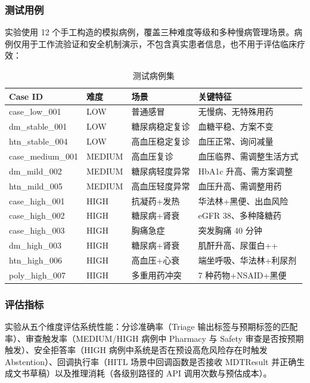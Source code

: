 \documentclass[11pt,a4paper]{ctexart}
\begin{document}
\subsubsection{测试用例}

实验使用 12 个手工构造的模拟病例，覆盖三种难度等级和多种慢病管理场景。病例仅用于工作流验证和安全机制演示，不包含真实患者信息，也不用于评估临床疗效：

\begin{table}[H]
\centering
\caption{测试病例集}
\label{tab:cases}
\small
\begin{tabularx}{\textwidth}{l|l|l|X}
\toprule
\textbf{Case ID} & \textbf{难度} & \textbf{场景} & \textbf{关键特征} \\
\midrule
case\_low\_001 & LOW & 普通感冒 & 无慢病、无特殊用药 \\
dm\_stable\_001 & LOW & 糖尿病稳定复诊 & 血糖平稳、方案不变 \\
htn\_stable\_004 & LOW & 高血压稳定复诊 & 血压正常、询问减量 \\
\hline
case\_medium\_001 & MEDIUM & 高血压复诊 & 血压临界、需调整生活方式 \\
dm\_mild\_002 & MEDIUM & 糖尿病轻度异常 & HbA1c 升高、需方案调整 \\
htn\_mild\_005 & MEDIUM & 高血压轻度异常 & 血压升高、需调整用药 \\
\hline
case\_high\_001 & HIGH & 抗凝药+发热 & 华法林+黑便、出血风险 \\
case\_high\_002 & HIGH & 糖尿病+肾衰 & eGFR 38、多种降糖药 \\
case\_high\_003 & HIGH & 胸痛急症 & 突发胸痛 40 分钟 \\
dm\_high\_003 & HIGH & 糖尿病+肾衰 & 肌酐升高、尿蛋白++ \\
htn\_high\_006 & HIGH & 高血压+心衰 & 端坐呼吸、华法林+利尿剂 \\
poly\_high\_007 & HIGH & 多重用药冲突 & 7 种药物+NSAID+黑便 \\
\bottomrule
\end{tabularx}
\end{table}

\subsubsection{评估指标}

实验从五个维度评估系统性能：分诊准确率（Triage 输出标签与预期标签的匹配率）、审查触发率（MEDIUM/HIGH 病例中 Pharmacy 与 Safety 审查是否按预期触发）、安全拒答率（HIGH 病例中系统是否在预设高危风险存在时触发 Abstention）、回调执行率（HITL 场景中回调函数是否接收 MDTResult 并正确生成文书草稿）以及推理消耗（各级别路径的 API 调用次数与预估成本）。
\end{document}
